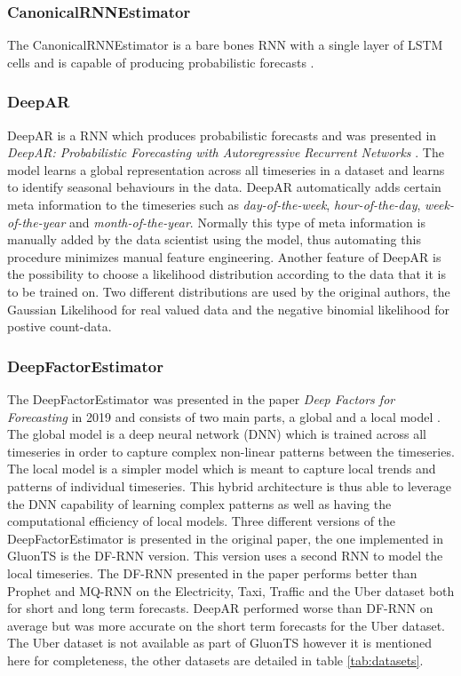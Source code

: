 \subsubsection{CanonicalRNNEstimator}
The CanonicalRNNEstimator is a bare bones RNN with a single layer of LSTM cells and is capable of producing probabilistic forecasts \cite{gluonts-github}.

\subsubsection{DeepAR}
\label{algo:deepar}
DeepAR is a RNN which produces probabilistic forecasts and was presented in \textit{DeepAR: Probabilistic Forecasting with Autoregressive Recurrent Networks} \cite{salinas_deepar_2019}. The model learns a global representation across all timeseries in a dataset and learns to identify seasonal behaviours in the data. DeepAR automatically adds certain meta information to the timeseries such as \textit{day-of-the-week}, \textit{hour-of-the-day}, \textit{week-of-the-year} and \textit{month-of-the-year}. Normally this type of meta information is manually added by the data scientist using the model, thus automating this procedure minimizes manual feature engineering. Another feature of DeepAR is the possibility to choose a likelihood distribution according to the data that it is to be trained on. Two different distributions are used by the original authors, the Gaussian Likelihood for real valued data and the negative binomial likelihood for postive count-data.

\subsubsection{DeepFactorEstimator}
The DeepFactorEstimator was presented in the paper \textit{Deep Factors for Forecasting} in 2019 and consists of two main parts, a global and a local model \cite{wang_deep_2019}. The global model is a deep neural network (DNN) which is trained across all timeseries in order to capture complex non-linear patterns between the timeseries. The local model is a simpler model which is meant to capture local trends and patterns of individual timeseries. This hybrid architecture is thus able to leverage the DNN capability of learning complex patterns as well as having the computational efficiency of local models. Three different versions of the DeepFactorEstimator is presented in the original paper, the one implemented in GluonTS is the DF-RNN version. This version uses a second RNN to model the local timeseries. The DF-RNN presented in the paper performs better than Prophet and MQ-RNN on the Electricity, Taxi, Traffic and the Uber dataset both for short and long term forecasts. DeepAR performed worse than DF-RNN on average but was more accurate on the short term forecasts for the Uber dataset. The Uber dataset is not available as part of GluonTS however it is mentioned here for completeness, the other datasets are detailed in table \ref{tab:datasets}.


